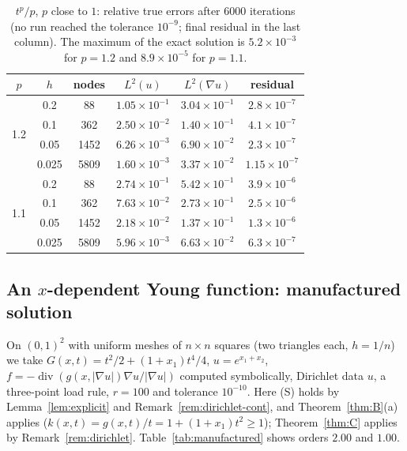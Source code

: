 \documentclass[11pt]{amsart}
\theoremstyle{definition}
\theoremstyle{remark}
\numberwithin{equation}{section}
\newcommand{\abs}[1]{\lvert #1\rvert}
\DeclareMathOperator{\divg}{div}
\begin{document}
\begin{table}[t]
\caption{$t^p/p$, $p$ close to $1$: relative true errors after $6000$ iterations (no run reached the tolerance $10^{-9}$; final residual in the last column). The maximum of the exact solution is $5.2\times10^{-3}$ for $p=1.2$ and $8.9\times10^{-5}$ for $p=1.1$.}\label{tab:pto1}
\small
\begin{tabular}{@{}cccccc@{}}
\toprule
$p$ & $h$ & nodes & $L^2(u)$ & $L^2(\nabla u)$ & residual\\
\midrule
\multirow{4}{*}{1.2} & 0.2 & 88 & $1.05\times10^{-1}$ & $3.04\times10^{-1}$ & $2.8\times10^{-7}$\\
 & 0.1 & 362 & $2.50\times10^{-2}$ & $1.40\times10^{-1}$ & $4.1\times10^{-7}$\\
 & 0.05 & 1452 & $6.26\times10^{-3}$ & $6.90\times10^{-2}$ & $2.3\times10^{-7}$\\
 & 0.025 & 5809 & $1.60\times10^{-3}$ & $3.37\times10^{-2}$ & $1.15\times10^{-7}$\\
\midrule
\multirow{4}{*}{1.1} & 0.2 & 88 & $2.74\times10^{-1}$ & $5.42\times10^{-1}$ & $3.9\times10^{-6}$\\
 & 0.1 & 362 & $7.63\times10^{-2}$ & $2.73\times10^{-1}$ & $2.5\times10^{-6}$\\
 & 0.05 & 1452 & $2.18\times10^{-2}$ & $1.37\times10^{-1}$ & $1.3\times10^{-6}$\\
 & 0.025 & 5809 & $5.96\times10^{-3}$ & $6.63\times10^{-2}$ & $6.3\times10^{-7}$\\
\bottomrule
\end{tabular}
\end{table}

\subsection{\texorpdfstring{An $x$-dependent Young function: manufactured solution}{An x-dependent Young function: manufactured solution}}\label{ssec:manufactured}
On $(0,1)^2$ with uniform meshes of $n\times n$ squares (two triangles each, $h=1/n$) we take $G(x,t)=t^2/2+(1+x_1)t^4/4$, $u=e^{x_1+x_2}$, $f=-\divg(g(x,\abs{\nabla u})\nabla u/\abs{\nabla u})$ computed symbolically, Dirichlet data $u$, a three-point load rule, $r=100$ and tolerance $10^{-10}$. Here (S) holds by Lemma~\ref{lem:explicit} and Remark~\ref{rem:dirichlet-cont}, and Theorem~\ref{thm:B}(a) applies ($k(x,t)=g(x,t)/t=1+(1+x_1)t^2\ge1$); Theorem~\ref{thm:C} applies by Remark~\ref{rem:dirichlet}. Table~\ref{tab:manufactured} shows orders $2.00$ and $1.00$.
\end{document}
